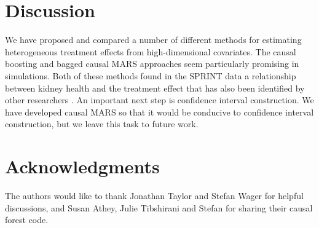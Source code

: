\documentclass{article}
\begin{document}
\section{Discussion}
\label{sec-discussion}

We have proposed and compared a number of different methods for estimating
heterogeneous treatment effects from high-dimensional covariates. The causal
boosting and bagged causal MARS approaches seem particularly promising in
simulations. Both of these methods found in the SPRINT data a relationship
between kidney health and the treatment effect that has also been identified
by other researchers \citep{RenalityCheck}. An important next step is confidence
interval construction. We have developed causal MARS so that it would be
conducive to confidence interval construction, but we leave this task to future
work.




\section{Acknowledgments}

The authors would like to thank Jonathan Taylor and Stefan Wager for helpful
discussions, and Susan Athey, Julie Tibshirani and Stefan for sharing their
causal forest code.






\end{document}
